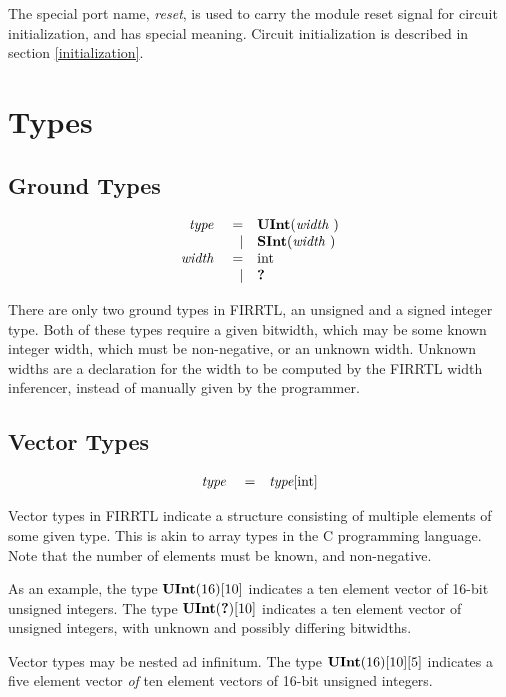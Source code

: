\documentclass[12pt]{article}
\begin{document}
The special port name, {\em reset}, is used to carry the module reset signal for circuit initialization, and has special meaning.
Circuit initialization is described in section \ref{initialization}. 

\section{Types}

\subsection{Ground Types}
\[
\begin{array}{rrl}
\text{\em type\ }       &=     &\text{\bf UInt}(\text{\em width\ })      \\
                &\vert &\text{\bf SInt}(\text{\em width\ })      \\
\text{\em width\ }      &=     &\text{int}                       \\
                &\vert &\text{\bf ?\ }                      \\
\end{array}
\]

There are only two ground types in FIRRTL, an unsigned and a signed integer type.
Both of these types require a given bitwidth, which may be some known integer width, which must be non-negative, or an unknown width.
Unknown widths are a declaration for the width to be computed by the FIRRTL width inferencer, instead of manually given by the programmer.

\subsection{Vector Types}
\[
\begin{array}{rrl}
\text{\em type\ }       &=     &\text{\em type}[\text{int}]           \\
\end{array}
\]

Vector types in FIRRTL indicate a structure consisting of multiple elements of some given type.
This is akin to array types in the C programming language.
Note that the number of elements must be known, and non-negative.

As an example, the type $\text{\bf UInt}(16)[10]$ indicates a ten element vector of 16-bit unsigned integers.
The type $\text{\bf UInt}(\text{\bf ?})[10]$ indicates a ten element vector of unsigned integers, with unknown and possibly differing bitwidths.

Vector types may be nested ad infinitum.
The type $\text{\bf UInt}(16)[10][5]$ indicates a five element vector {\em of} ten element vectors of 16-bit unsigned integers.
\end{document}
